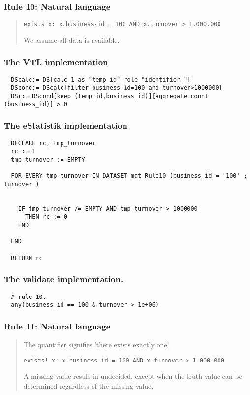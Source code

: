 \newpage

\subsubsection*{  Rule 10: Natural language}
\begin{quote}


\begin{verbatim}
exists x: x.business-id = 100 AND x.turnover > 1.000.000
\end{verbatim}

We assume all data is available.


\end{quote}
\subsubsection*{The VTL implementation}
\begin{verbatim}
  DScalc:= DS[calc 1 as "temp_id" role "identifier "]
  DScond:= DScalc[filter business_id=100 and turnover>1000000]
  DSr:= DScond[keep (temp_id,business_id)][aggregate count (business_id)] > 0
\end{verbatim}
\subsubsection*{The eStatistik implementation}
\begin{verbatim}
  DECLARE rc, tmp_turnover 
  rc := 1
  tmp_turnover := EMPTY

  FOR EVERY tmp_turnover IN DATASET mat_Rule10 (business_id = '100' ; turnover )


    IF tmp_turnover /= EMPTY AND tmp_turnover > 1000000
      THEN rc := 0
    END

  END

  RETURN rc
\end{verbatim}
\subsubsection*{The validate implementation.}
\begin{verbatim}
  # rule_10:
  any(business_id == 100 & turnover > 1e+06)
\end{verbatim}


\newpage

\subsubsection*{  Rule 11: Natural language}
\begin{quote}


The  quantifier signifies 'there exists exactly one'.


\begin{verbatim}
exists! x: x.business-id = 100 AND x.turnover > 1.000.000
\end{verbatim}

A missing value resuls in undecided, except when the truth value can be determined regardless of the missing value.



\end{quote}
